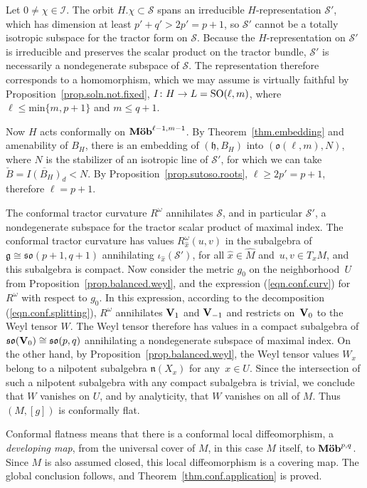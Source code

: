 \documentclass[pdftex]{sigma}
\numberwithin{equation}{section}
\theoremstyle{definition}
\newcommand{\lieh}{\mathfrak{h}}
\def\g{{\mathfrak g}}
\def\n{{\mathfrak n}}
\newcommand{\so}{\mathfrak{so}}
\newcommand{\SO}{{\rm SO}}
\begin{document}
 Let $0 \neq \chi \in \mathcal{I}$. The orbit $H.\chi \subset \mathcal{S}$ spans an irreducible $H$-representation $\mathcal{S'}$,
 which has dimension at least $p'+q' > 2 p' = p+1$, so $\mathcal{S'}$ cannot be a totally isotropic subspace for the tractor form on $\mathcal{S}$. Because the $H$-representation on $\mathcal{S}'$ is irreducible and preserves the scalar product on the tractor bundle, $\mathcal{S}'$ is necessarily a nondegenerate subspace of $\mathcal{S}$. The representation therefore corresponds to a homomorphism, which we may assume is virtually faithful by Proposition~\ref{prop.soln.not.fixed}, $I \colon H \rightarrow L = \SO(\ell, m)$, where $\ell \leq \mbox{min}\{ m, p+1 \}$ and $m \leq q+1$.

Now $H$ acts conformally on $\mbox{\bf M\"ob}^{\ell-1, m-1}$. By Theorem~\ref{thm.embedding} and amenability of $B_H$, there is
an embedding of $(\lieh, B_H)$ into $(\mathfrak{o}(\ell, m), N)$, where $N$ is the stabilizer of an isotropic line of $\mathcal{S}'$, for which we can take $\check{B} = \overline{I(B_H)}_d < N$.
By Proposition~\ref{prop.sutoso.roots}, $\ell \geq 2 p' = p+1$, therefore $\ell = p+1$.

The conformal tractor curvature $R^\omega$ annihilates $\mathcal{S}$, and in particular $\mathcal{S}'$, a nondegenerate subspace for the tractor scalar product of maximal index. The conformal tractor curvature has values $R^\omega_{\hat{x}}(u,v)$ in the subalgebra of $\g \cong \so(p+1,q+1)$ annihilating $\iota_{\hat{x}} (\mathcal{S}')$, for all $\hat{x} \in \hat{M}$ and~${u,v \in T_x M}$, and this subalgebra is compact.
 Now consider the metric $g_0$ on the neighborhood~$U$ from Proposition~\ref{prop.balanced.weyl}, and the expression (\ref{eqn.conf.curv}) for $R^\omega$ with respect to $g_0$. In this expression, according to the decomposition (\ref{eqn.conf.splitting}), $R^\omega$ annihilates ${\bf V}_{1}$ and ${\bf V}_{-1}$ and restricts on~${\bf V}_0$ to the Weyl tensor $W$. The Weyl tensor therefore has values in a compact subalgebra of $\so({\bf V}_0) \cong \so(p,q)$ annihilating a nondegenerate subspace of maximal index.
On the other hand, by Proposition~\ref{prop.balanced.weyl}, the Weyl tensor values $W_x$ belong to a nilpotent subalgebra $\n(X_x)$ for any~${x \in U}$.
Since the intersection of such a nilpotent subalgebra with any compact subalgebra is trivial, we conclude that $W$ vanishes on $U$, and by analyticity, that $W$ vanishes on all of $M$. Thus $(M,[g])$ is conformally flat.

Conformal flatness means that there is a conformal local diffeomorphism, a \emph{developing map}, from the universal cover of $M$, in this case $M$ itself, to $\mbox{\bf M\"ob}^{p,q}$. Since $M$ is also assumed closed, this local diffeomorphism is a covering map. The global conclusion follows, and Theorem~\ref{thm.conf.application} is proved.
\end{document}
